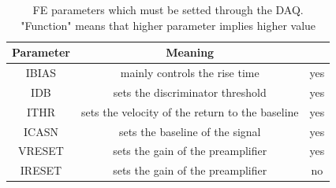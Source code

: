             \begin{table}
                \begin{center}
                \begin{tabular}{|c | c | c |}
                \hline
                Parameter & Meaning & \\
                \hline
                \hline
                IBIAS & mainly controls the rise time & yes\\
                IDB & sets the discriminator threshold & yes\\
                ITHR & sets the velocity of the return to the baseline & yes \\
                ICASN & sets the baseline of the signal & yes\\
                VRESET & sets the gain of the preamplifier & yes\\
                IRESET & sets the gain of the preamplifier & no\\
                \hline
                \end{tabular}
                \caption{FE parameters which must be setted through the DAQ. "Function" means that higher parameter implies higher value}
                \label{tab:FE-parameters}
                \end{center}
            \end{table}
    



